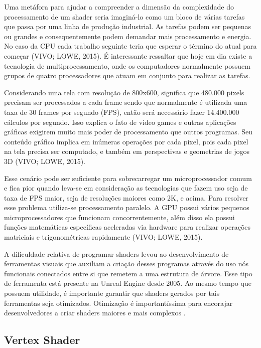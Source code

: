 Uma metáfora para ajudar a compreender a dimensão da complexidade do processamento de um shader seria imaginá-lo como um bloco de várias tarefas que passa por uma linha de produção industrial. As tarefas podem ser pequenas ou grandes e consequentemente podem demandar mais processamento e energia. No caso da CPU cada trabalho seguinte teria que esperar o término do atual para começar (VIVO; LOWE, 2015)\nocite{bookOfShaders}. É interessante ressaltar que hoje em dia existe a tecnologia de multiprocessamento, onde os computadores normalmente possuem grupos de quatro processadores que atuam em conjunto para realizar as tarefas.

Considerando uma tela com resolução de 800x600, significa que 480.000 pixels precisam ser processados a cada frame sendo que normalmente é utilizada uma taxa de 30 frames por segundo (\acrshort{FPS}), então será necessário fazer 14.400.000 cálculos por segundo. Isso explica o fato de video games e outras aplicações gráficas exigirem muito mais poder de processamento que outros programas. Seu conteúdo gráfico implica em inúmeras operações por cada pixel, pois cada pixel na tela precisa ser computado, e também em perspectivas e geometrias de jogos 3D (VIVO; LOWE, 2015)\nocite{bookOfShaders}.  

Esse cenário pode ser suficiente para sobrecarregar um microprocessador comum e fica pior quando leva-se em consideração as tecnologias que fazem uso seja de taxa de FPS maior, seja de resoluções maiores como 2K, e acima. Para resolver esse problema utiliza-se processamento paralelo. A GPU possui vários pequenos microprocessadores que funcionam concorrentemente, além disso ela possui funções matemáticas específicas aceleradas via hardware para realizar operações matriciais e trigonométricas rapidamente (VIVO; LOWE, 2015)\nocite{bookOfShaders}.

A dificuldade relativa de programar shaders levou ao desenvolvimento de ferramentas visuais que auxiliam a criação desses programas através do uso nós funcionais conectados entre si que remetem a uma estrutura de árvore. Esse tipo de ferramenta está presente na Unreal Engine desde 2005. Ao mesmo tempo que possuem utilidade, é importante garantir que shaders gerados por tais ferramentas seja otimizados. Otimização é importantíssima para encorajar desenvolvedores a criar shaders maiores e mais complexos \cite{jensen2007shader}.

\subsection{Vertex Shader}
\label{vertex-shader}

